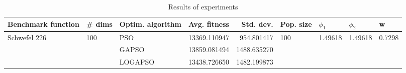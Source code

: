 \begin{table}
\centering
\caption{Results of experiments}
\begin{tabular}{lllrrllll}
\toprule
           Benchmark function &              \# dims & Optim. algorithm &  Avg. fitness &   Std. dev. &            Pop. size &               $\phi_{1}$ &               $\phi_{2}$ &                       w \\
\midrule
\multirow{3}{*}{Schwefel 226} & \multirow{3}{*}{100} &              PSO &  13369.110947 &  954.801417 & \multirow{3}{*}{100} & \multirow{3}{*}{1.49618} & \multirow{3}{*}{1.49618} & \multirow{3}{*}{0.7298} \\
                              &                      &            GAPSO &  13859.081494 & 1488.635270 &                      &                          &                          &                         \\
                              &                      &          LOGAPSO &  13438.726650 & 1482.199873 &                      &                          &                          &                         \\
\bottomrule
\end{tabular}
\end{table}
